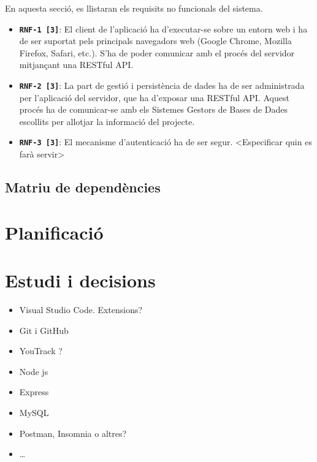 \documentclass[a4paper,12pt]{ThesisStyle}
\begin{document}
En aquesta secció, es llistaran els requisits no funcionals del sistema.

\begin{itemize}
  \item \texttt{\textbf{RNF-1 [3]}}: El client de l'aplicació ha d'executar-se sobre un entorn web i ha de ser suportat pels principals navegadors web (Google Chrome, Mozilla Firefox, Safari, etc.). S'ha de poder comunicar amb el procés del servidor mitjançant una RESTful API.
  \item \texttt{\textbf{RNF-2 [3]}}: La part de gestió i persistència de dades ha de ser administrada per l'aplicació del servidor, que ha d'exposar una RESTful API. Aquest procés ha de comunicar-se amb els Sistemes Gestors de Bases de Dades escollits per allotjar la informació del projecte.
  \item \texttt{\textbf{RNF-3 [3]}}: El mecanisme d'autenticació ha de ser segur. <Especificar quin es farà servir>
\end{itemize}


\section{Matriu de dependències}
\label{sec:matriu_dependencies}


\chapter{Planificació}  %
\label{cap:planificacio}



\chapter{Estudi i decisions}
\label{cap:estudi}

\begin{itemize}
  \item Visual Studio Code. Extensions?
  \item Git i GitHub
  \item YouTrack ?
  \item Node js
  \item Express
  \item MySQL
  \item Postman, Insomnia o altres?
  \item \ldots
\end{itemize}
\end{document}
